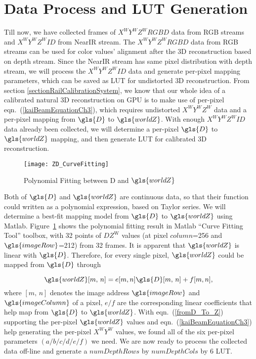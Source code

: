 \section{Data Process and \gls{LUT} Generation}
Till now, we have collected frames of \(X^WY^WZ^WRGBD\) data from RGB streams and \(X^WY^WZ^WID\) from \gls{NearIR} stream. The \(X^WY^WZ^WRGBD\) data from RGB streams can be used for color values' alignment after the \gls{3D} reconstruction based on depth stream. Since the \gls{NearIR} stream has same pixel distribution with depth stream, we will process the \(X^WY^WZ^WID\) data and generate per-pixel mapping parameters, which can be saved as \gls{LUT} for undistorted \gls{3D} reconstruction. From section \ref{sectionRailCalibrationSystem}, we know that our whole idea of a calibrated natural \gls{3D} reconstruction on \gls{GPU} is to make use of per-pixel eqn.~(\ref{kaiBeamEquationCh3}), which requires undistorted \(X^WY^WZ^W\) data and a per-pixel mapping from \(\gls{D}\) to \(\gls{worldZ}\). With enough \(X^WY^WZ^WID\) data already been collected, we will determine a per-pixel \(\gls{D}\) to \(\gls{worldZ}\) mapping, and then generate \gls{LUT} for calibrated \gls{3D} reconstruction.
\\\indent
\begin{figure}[b]
\centering
\texttt{[image: ZD\_CurveFitting]}
\caption{Polynomial Fitting between \gls{D} and \(\gls{worldZ}\)}
\label{ZD_CurveFitting}
\end{figure}%
%
Both of \(\gls{D}\) and \(\gls{worldZ}\) are continuous data, so that their function could written as a polynomial expression, based on Taylor series. We will determine a best-fit mapping model from \(\gls{D}\) to \(\gls{worldZ}\) using Matlab. Figure~\ref{ZD_CurveFitting} shows the polynomial fitting result in Matlab \enquote{Curve Fitting Tool} toolbox, with 32 points of \(DZ^\text{W}\) values (at pixel \(column\)=256 and \(\gls{imageRow}\)=212) from 32 frames. It is apparent that \(\gls{worldZ}\) is linear with \(\gls{D}\). Therefore, for every single pixel, \(\gls{worldZ}\) could be mapped from \(\gls{D}\) through \par
%
\begin{equation}
\gls{worldZ}[m, \, n] = e[m, n]\gls{D}[m, \, n]+f[m, n] ,
\label{fromD_To_Z}
\end{equation}%
%
\noindent
where \([m, \, n]\) denotes the image address \(\gls{imageRow}\) and \(\gls{imageColumn}\) of a pixel, \(e/f\) are the corresponding linear coefficients that help map from \(\gls{D}\) to \(\gls{worldZ}\). With eqn.~(\ref{fromD_To_Z}) supporting the per-pixel \(\gls{worldZ}\) values and eqn.~(\ref{kaiBeamEquationCh3}) help generating the per-pixel \(X^WY^W\) values, we found all of the six per-pixel parameters \((a/b/c/d/e/f)\) we need. We are now ready to process the collected data off-line and generate a \(numDepthRows\) by \(numDepthCols\) by 6 \gls{LUT}.

